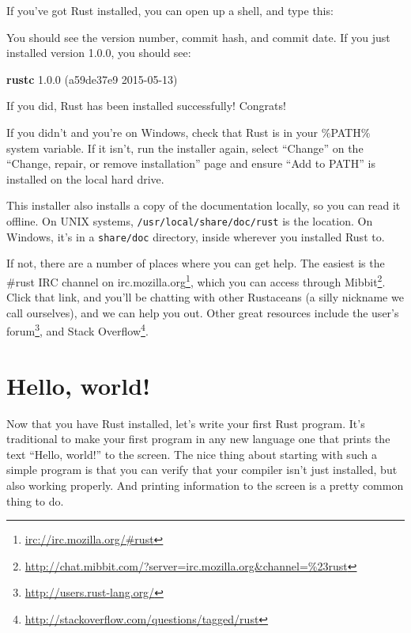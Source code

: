 \documentclass[a4paper,]{book}
\newenvironment{Shaded}{\begin{snugshade}}{\end{snugshade}}
\newcommand{\KeywordTok}[1]{\textcolor[rgb]{0.13,0.29,0.53}{\textbf{{#1}}}}
\newcommand{\NormalTok}[1]{{#1}}
\renewcommand{\href}[2]{#2\footnote{\url{#1}}}
\begin{document}
If you've got Rust installed, you can open up a shell, and type this:

\begin{Shaded}
\end{Shaded}

You should see the version number, commit hash, and commit date. If you
just installed version 1.0.0, you should see:

\begin{Shaded}
\begin{Highlighting}[]
\KeywordTok{rustc} \NormalTok{1.0.0 (a59de37e9 2015-05-13)}
\end{Highlighting}
\end{Shaded}

If you did, Rust has been installed successfully! Congrats!

If you didn't and you're on Windows, check that Rust is in your \%PATH\%
system variable. If it isn't, run the installer again, select ``Change''
on the ``Change, repair, or remove installation'' page and ensure ``Add
to PATH'' is installed on the local hard drive.

This installer also installs a copy of the documentation locally, so you
can read it offline. On UNIX systems, \texttt{/usr/local/share/doc/rust}
is the location. On Windows, it's in a \texttt{share/doc} directory,
inside wherever you installed Rust to.

If not, there are a number of places where you can get help. The easiest
is \href{irc://irc.mozilla.org/\#rust}{the \#rust IRC channel on
irc.mozilla.org}, which you can access through
\href{http://chat.mibbit.com/?server=irc.mozilla.org\&channel=\%23rust}{Mibbit}.
Click that link, and you'll be chatting with other Rustaceans (a silly
nickname we call ourselves), and we can help you out. Other great
resources include \href{http://users.rust-lang.org/}{the user's forum},
and \href{http://stackoverflow.com/questions/tagged/rust}{Stack
Overflow}.

\section{Hello, world!}\label{sec--hello-world}

Now that you have Rust installed, let's write your first Rust program.
It's traditional to make your first program in any new language one that
prints the text ``Hello, world!'' to the screen. The nice thing about
starting with such a simple program is that you can verify that your
compiler isn't just installed, but also working properly. And printing
information to the screen is a pretty common thing to do.
\end{document}
